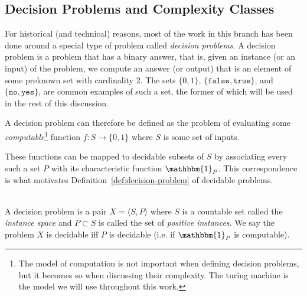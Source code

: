 \subsection{Decision Problems and Complexity Classes}

For historical (and technical) reasons, most of the work in this branch has been done around a special type of problem called \emph{decision problems}. A decision problem is a problem that has a binary answer, that is, given an instance (or an input) of the problem, we compute an answer (or output) that is an element of some preknown set with cardinality 2. The sets \(\{0, 1\}\), \(\{\texttt{false}, \texttt{true}\}\), and \(\{\texttt{no}, \texttt{yes}\}\), are common examples of such a set, the former of which will be used in the rest of this discussion.

A decision problem can therefore be defined as the problem of evaluating some \emph{computable}\footnote{The model of computation is not important when defining decision problems, but it becomes so when discussing their complexity. The turing machine is the model we will use throughout this work.} function \(f: S \rightarrow \{0, 1\}\) where \(S\) is some set of inputs.

These functions can be mapped to decidable subsets of \(S\) by associating every such a set \(P\) with its characteristic function \(\mathbbm{1}_P\). This correspondence is what motivates Definition~\ref{def:decision-problem} of decidable problems.

\begin{definition}\ \\
    \label{def:decision-problem}
    A decision problem is a pair \(X = \langle S, P \rangle\) where \(S\) is a countable set called the \emph{instance space} and \(P \subset S\) is called the set of \emph{positive instances}. We say the problem \(X\) is decidable iff \(P\) is decidable (i.e. if \(\mathbbm{1}_P\) is computable).
\end{definition}

